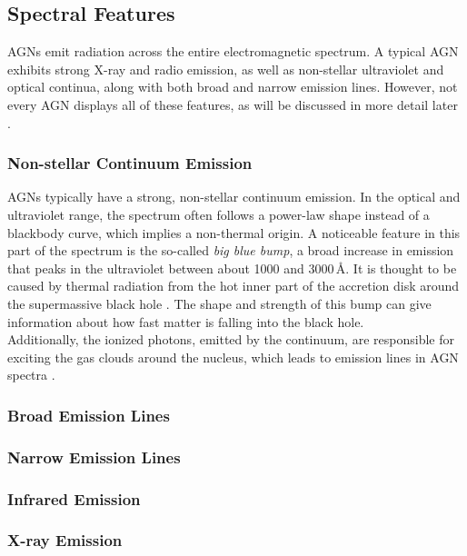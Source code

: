 \subsection{Spectral Features}

AGNs emit radiation across the entire electromagnetic spectrum. A typical AGN exhibits strong X-ray and radio emission, as well as non-stellar ultraviolet and optical continua, along with both broad and narrow emission lines. However, not every AGN displays all of these features, as will be discussed in more detail later \parencite{peterson1997introduction}.
\subsubsection{Non-stellar Continuum Emission}
AGNs typically have a strong, non-stellar continuum emission. In the optical and ultraviolet range, the spectrum often follows a power-law shape instead of a blackbody curve, which implies a non-thermal origin. A noticeable feature in this part of the spectrum is the so-called \emph{big blue bump}, a broad increase in emission that peaks in the ultraviolet between about 1000 and 3000\,\AA. It is thought to be caused by thermal radiation from the hot inner part of the accretion disk around the supermassive black hole \parencite{peterson1997introduction, osterbrock1989agn}. The shape and strength of this bump can give information about how fast matter is falling into the black hole. \\
Additionally, the ionized photons, emitted by the continuum, are responsible for exciting the gas clouds around the nucleus, which leads to emission lines in AGN spectra \parencite{osterbrock1989agn}.

\subsubsection{Broad Emission Lines}


\subsubsection{Narrow Emission Lines}


\subsubsection{Infrared Emission}


\subsubsection{X-ray Emission}



